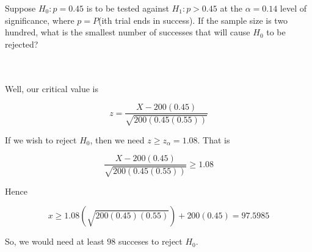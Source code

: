 Suppose $H_0:p=0.45$ is to be tested against $H_1:p>0.45$ at the $\alpha=0.14$ level of significance,
where $p =P$(ith trial ends in success). If the sample size is two hundred, what is the smallest number
of successes that will cause $H_0$ to be rejected?\\\\

\begin{solution}\renewcommand{\qedsymbol}{}\ \\
    Well, our critical value is
    
    $$z=\frac{X-200(0.45)}{\sqrt{200(0.45(0.55))}}$$
    
    If we wish to reject $H_0$, then we need $z\geq z_{\alpha}=1.08$. That is

    $$\frac{X-200(0.45)}{\sqrt{200(0.45(0.55))}}\geq1.08$$
    
    Hence
    
    $$x\geq1.08(\sqrt{200(0.45)(0.55)})+200(0.45)=97.5985$$
    
    So, we would need at least $98$ succeses to reject $H_0$.

\end{solution}
